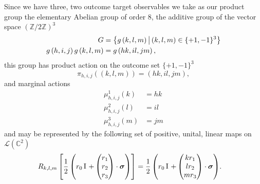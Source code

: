 Since we have three, two outcome target observables we take as our product group the elementary Abelian group of order $8$, the additive group of the vector space $\left(\mathbb{Z}/2\mathbb{Z}\right)^3$
\begin{align}
  G &= \left\{g\left({k}, {l}, {m}\right)\,\middle|\,(k,l,m)\in \{+1, -1\}^3\right\}\\
  g\left({h}, {i}, {j}\right) g\left({k}, {l}, {m}\right) &= g\left({hk}, {il}, {jm}\right),
\end{align}
this group has product action on the outcome set $\{+1,-1\}^3$
\begin{equation}
  \pi_{h,i,j}\left((k,l,m)\right) = (hk,il,jm),
\end{equation}
and marginal actions
\begin{align}
  \mu^1_{h,i,j} \left(k\right) &= hk\\
  \mu^2_{h,i,j} \left(l\right) &= il\\
  \mu^3_{h,i,j} \left(m\right) &= jm
\end{align}
and may be represented by the following set of positive, unital, linear maps on $\mathcal{L}(\mathbb{C}^2)$
\begin{align}
  \map{k}{l}{m}\left[\qbit[r_0]{\begin{pmatrix}r_1\\r_2\\r_3\end{pmatrix}}\right] &= \qbit[r_0]{\begin{pmatrix}k r_1\\l r_2\\m r_3\end{pmatrix}}.
\end{align}

